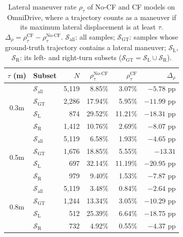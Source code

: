 \documentclass{article}
\begin{document}
\begin{table}[h]
\centering
\setlength{\tabcolsep}{5pt}
\begin{tabular}{@{}clrrrr@{}}
\toprule
$\tau$ (m) & Subset & $N$ & $\rho_\tau^{\text{No-CF}}$ & $\rho_\tau^{\text{CF}}$ & $\Delta_\rho$  \\
\midrule
\multirow{4}{*}{0.3m}
& $\mathcal{S}_{\text{all}}$& 5,119 & 8.85\%  & 3.07\% & $-5.78$ pp  \\
& $\mathcal{S}_{\text{GT}}$ & 2,286 & 17.94\% & 5.95\% & $-11.99$ pp \\
& $\mathcal{S}_{\text{L}}$  & 874   & 29.52\% & 11.21\% & $-18.31$ pp \\
& $\mathcal{S}_{\text{R}}$  & 1,412 & 10.76\% & 2.69\% & $-8.07$ pp \\
\midrule
\multirow{4}{*}{0.5m}
& $\mathcal{S}_{\text{all}}$& 5,119 & 6.58\%  & 1.93\% & $-4.65$ pp \\
& $\mathcal{S}_{\text{GT}}$ & 1,676 & 18.85\% & 5.55\% & $-13.31$ \\
& $\mathcal{S}_{\text{L}}$  & 697   & 32.14\% & 11.19\% & $-20.95$ pp \\
& $\mathcal{S}_{\text{R}}$  & 979   & 9.40\%  & 1.53\% & $-7.87$ pp \\
\midrule
\multirow{4}{*}{0.8m}
& $\mathcal{S}_{\text{all}}$& 5,119 & 3.48\%  & 0.84\% & $-2.64$ pp \\
& $\mathcal{S}_{\text{GT}}$ & 1,244 & 13.34\% & 3.05\% & $-10.29$ pp \\
& $\mathcal{S}_{\text{L}}$  & 512   & 25.39\% & 6.64\% & $-18.75$ pp \\
& $\mathcal{S}_{\text{R}}$  & 732   & 4.92\%  & 0.55\% & $-4.37$ pp \\
\bottomrule
\end{tabular}
\caption{Lateral maneuver rate $\rho_\tau$ of No-CF and CF models on OmniDrive, where a trajectory counts as a maneuver if its maximum lateral displacement is at least $\tau$. $\Delta_\rho=\rho_\tau^{\text{CF}}-\rho_\tau^{\text{No-CF}}$. $\mathcal{S}_{\text{all}}$: all samples; $\mathcal{S}_{\text{GT}}$: samples whose ground-truth trajectory contains a lateral maneuver; $\mathcal{S}_{\text{L}}$, $\mathcal{S}_{\text{R}}$: its left- and right-turn subsets ($\mathcal{S}_{\text{GT}}=\mathcal{S}_{\text{L}}\cup\mathcal{S}_{\text{R}}$).}
\label{tab:discussion:omnidrive}
\end{table}
\end{document}
